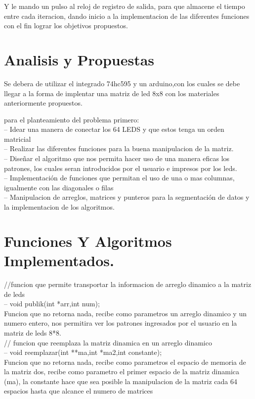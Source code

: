 \documentclass{article}
\begin{document}
Y le mando un pulso al reloj de registro de salida, para que almacene el tiempo entre cada iteracion, dando inicio a la implementacion de las diferentes funciones con el fin lograr los objetivos propuestos.

\section{Analisis y Propuestas} \label{contenido}

Se debera de utilizar el integrado 74hc595 y un arduino,con los cuales se debe llegar a la forma de implentar una matriz de led 8x8 con los materiales anteriormente propuestos.

para el planteamiento del problema primero:  \\

-- Idear una manera de conectar los 64 LEDS y que estos tenga un orden matricial\\

-- Realizar las diferentes funciones para la buena manipulacion de la matriz.\\

-- Diseñar el algoritmo que nos permita hacer uso de una manera eficas los patrones, los cuales seran introducidos por el usuario e impresos por los leds. \\

-- Implementación de funciones que permitan el uso de una o mas columnas, igualmente con las diagonales o filas\\

-- Manipulacion de arreglos, matrices y punteros para la segmentación de datos y la implementacion de los algoritmos. \\


\section{Funciones Y Algoritmos Implementados.} \label{contenido}

//funcion que permite transportar la informacion de arreglo dinamico a la matriz de leds\\
-- void publik(int *arr,int num);\\
Funcion que no retorna nada, recibe como parametros un arreglo dinamico y un numero entero, nos permitira ver los patrones ingresados por el usuario en la matriz de leds 8*8.\\


// funcion que reemplaza la matriz dinamica en un arreglo dinamico\\
-- void reemplazar(int **ma,int *ma2,int constante);\\
Funcion que no retorna nada, recibe como parametros el espacio de memoria de la matriz dos, recibe como parametro el primer espacio de la matriz dinamica (ma), la constante hace que sea posible la manipulacion de la matriz cada 64 espacios hasta que alcance el numero de matrices 
\end{document}

